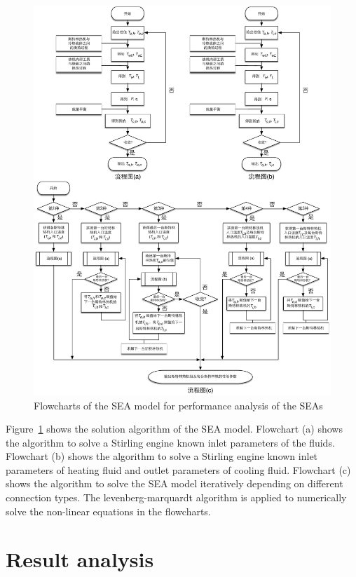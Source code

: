 \noindent \begin{figure}[htbp]
\begin{center}
	\includegraphics[width = 0.8\columnwidth]{fig/FlowChart}
	\caption{Flowcharts of the SEA model for performance analysis of the SEAs}
	\label{fig:Flowchart}
\end{center}
\end{figure}

Figure~\ref{fig:Flowchart} shows the solution algorithm of the SEA model. Flowchart (a) shows the algorithm to solve a Stirling engine known inlet parameters of the fluids. Flowchart (b) shows the algorithm to solve a Stirling engine known inlet parameters of heating fluid and outlet parameters of cooling fluid. Flowchart (c) shows the algorithm to solve the SEA model iteratively depending on different connection types. The levenberg-marquardt algorithm is applied to numerically solve the non-linear equations in the flowcharts.

\section{Result analysis}

